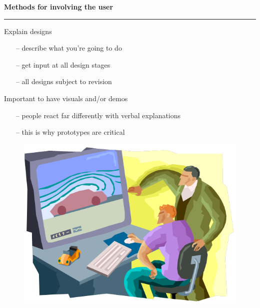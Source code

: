 \documentclass[pdf]{beamer}
\begin{document}
\begin{frame}
\vspace{8mm}
\textcolor{myBlue}{\textbf{\Large{Methods for involving the user}}}

\textcolor{red}{\rule{10cm}{1mm}}

\bigskip

{\LARGE Explain designs \LARGE}

\begin{itemize}
    \item[\textcolor{black}{--}] describe what you’re going to do
    \item[\textcolor{black}{--}] get input at all design stages
    \item[\textcolor{black}{--}] all designs subject to revision
\end{itemize}

\bigskip

{\LARGE Important to have visuals and/or demos \LARGE}

\begin{itemize}
    \item[\textcolor{black}{--}] people react far differently with verbal explanations
    \item[\textcolor{black}{--}] this is why prototypes are critical

\end{itemize}

\begin{figure}[b]
    	\begin{flushright}
    	\includegraphics[scale = 0.4]{10.PNG}
        \end{flushright}
        \end{figure}
\end{frame}
\end{document}
